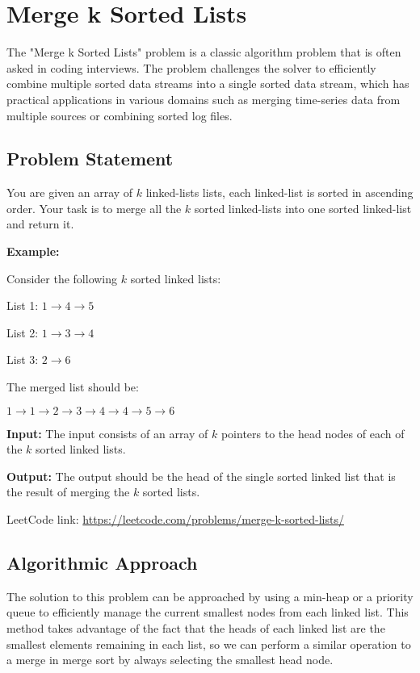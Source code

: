 \chapter{Merge k Sorted Lists}
\label{chap:Merge_k_Sorted_Lists}
The "Merge k Sorted Lists" problem is a classic algorithm problem that is often asked in coding interviews. The problem challenges the solver to efficiently combine multiple sorted data streams into a single sorted data stream, which has practical applications in various domains such as merging time-series data from multiple sources or combining sorted log files.

\section*{Problem Statement}
You are given an array of \(k\) linked-lists lists, each linked-list is sorted in ascending order. Your task is to merge all the \(k\) sorted linked-lists into one sorted linked-list and return it.

\textbf{Example:}

Consider the following \(k\) sorted linked lists:

List 1: \(1 \rightarrow 4 \rightarrow 5\)

List 2: \(1 \rightarrow 3 \rightarrow 4\)

List 3: \(2 \rightarrow 6\)

The merged list should be:

\(1 \rightarrow 1 \rightarrow 2 \rightarrow 3 \rightarrow 4 \rightarrow 4 \rightarrow 5 \rightarrow 6\)

\textbf{Input:} The input consists of an array of \(k\) pointers to the head nodes of each of the \(k\) sorted linked lists.

\textbf{Output:} The output should be the head of the single sorted linked list that is the result of merging the \(k\) sorted lists.

LeetCode link: \href{https://leetcode.com/problems/merge-k-sorted-lists/}{https://leetcode.com/problems/merge-k-sorted-lists/}

\section*{Algorithmic Approach}
The solution to this problem can be approached by using a min-heap or a priority queue to efficiently manage the current smallest nodes from each linked list. This method takes advantage of the fact that the heads of each linked list are the smallest elements remaining in each list, so we can perform a similar operation to a merge in merge sort by always selecting the smallest head node.


